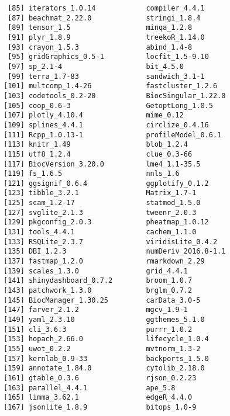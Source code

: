 \documentclass[
  letterpaper,
  DIV=11,
  numbers=noendperiod]{scrreprt}
\begin{document}
\begin{verbatim}
 [85] iterators_1.0.14            compiler_4.4.1             
 [87] beachmat_2.22.0             stringi_1.8.4              
 [89] tensor_1.5                  minqa_1.2.8                
 [91] plyr_1.8.9                  treekoR_1.14.0             
 [93] crayon_1.5.3                abind_1.4-8                
 [95] gridGraphics_0.5-1          locfit_1.5-9.10            
 [97] sp_2.1-4                    bit_4.5.0                  
 [99] terra_1.7-83                sandwich_3.1-1             
[101] multcomp_1.4-26             fastcluster_1.2.6          
[103] codetools_0.2-20            BiocSingular_1.22.0        
[105] coop_0.6-3                  GetoptLong_1.0.5           
[107] plotly_4.10.4               mime_0.12                  
[109] splines_4.4.1               circlize_0.4.16            
[111] Rcpp_1.0.13-1               profileModel_0.6.1         
[113] knitr_1.49                  blob_1.2.4                 
[115] utf8_1.2.4                  clue_0.3-66                
[117] BiocVersion_3.20.0          lme4_1.1-35.5              
[119] fs_1.6.5                    nnls_1.6                   
[121] ggsignif_0.6.4              ggplotify_0.1.2            
[123] tibble_3.2.1                Matrix_1.7-1               
[125] scam_1.2-17                 statmod_1.5.0              
[127] svglite_2.1.3               tweenr_2.0.3               
[129] pkgconfig_2.0.3             pheatmap_1.0.12            
[131] tools_4.4.1                 cachem_1.1.0               
[133] RSQLite_2.3.7               viridisLite_0.4.2          
[135] DBI_1.2.3                   numDeriv_2016.8-1.1        
[137] fastmap_1.2.0               rmarkdown_2.29             
[139] scales_1.3.0                grid_4.4.1                 
[141] shinydashboard_0.7.2        broom_1.0.7                
[143] patchwork_1.3.0             brglm_0.7.2                
[145] BiocManager_1.30.25         carData_3.0-5              
[147] farver_2.1.2                mgcv_1.9-1                 
[149] yaml_2.3.10                 ggthemes_5.1.0             
[151] cli_3.6.3                   purrr_1.0.2                
[153] hopach_2.66.0               lifecycle_1.0.4            
[155] uwot_0.2.2                  mvtnorm_1.3-2              
[157] kernlab_0.9-33              backports_1.5.0            
[159] annotate_1.84.0             cytolib_2.18.0             
[161] gtable_0.3.6                rjson_0.2.23               
[163] parallel_4.4.1              ape_5.8                    
[165] limma_3.62.1                edgeR_4.4.0                
[167] jsonlite_1.8.9              bitops_1.0-9               

\end{verbatim}
\end{document}
